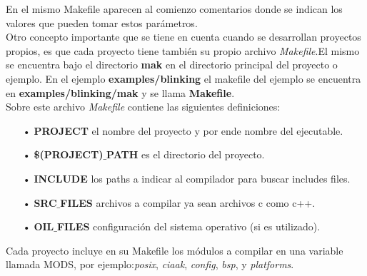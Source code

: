 \documentclass[12pt,letterpaper]{article}
\begin{document}
En el mismo Makefile aparecen al comienzo comentarios donde se indican los valores que pueden tomar estos parámetros.
 \\
 
Otro concepto importante que se tiene en cuenta cuando se desarrollan proyectos propios, es que cada proyecto tiene también su propio archivo \textit{Makefile}.El mismo se encuentra bajo el directorio \textbf{mak} en el directorio principal del proyecto o ejemplo. En el ejemplo \textbf{examples/blinking} el makefile del ejemplo se encuentra en \textbf{examples/blinking/mak} y se llama \textbf{Makefile}.
 \\
 
Sobre este archivo \textit{Makefile} contiene las siguientes definiciones:

\begin{enumerate}
\item[•] \textbf{PROJECT} el nombre del proyecto y por ende nombre del ejecutable.
\item[•] \textbf{\$(PROJECT)$\_$PATH} es el directorio del proyecto.
\item[•] \textbf{INCLUDE} los paths a indicar al compilador para buscar includes files.
\item[•] \textbf{SRC$\_$FILES} archivos a compilar ya sean archivos c como c++.
\item[•] \textbf{OIL$\_$FILES} configuración del sistema operativo (si es utilizado).
\end{enumerate}
Cada proyecto incluye en su Makefile los módulos a compilar en una variable llamada MODS, por ejemplo:\textit{posix}, \textit{ciaak}, \textit{config}, \textit{bsp}, y \textit{platforms}.
 \\
\end{document}
